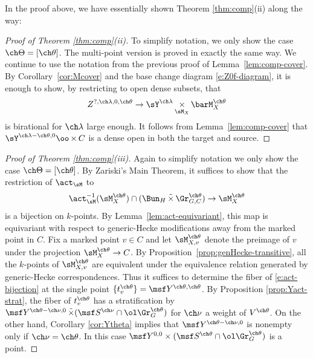 \documentclass[final]{amsart}
\theoremstyle{remark}
\theoremstyle{definition}
\DeclareMathOperator*{\ttimes}{\tilde\times}
\DeclareMathOperator*{\xt}{\times}
\numberwithin{equation}{section}
\begin{document}
In the proof above, we have essentially shown 
Theorem \ref{thm:comp}(ii) along the way:

\begin{proof}[Proof of Theorem \ref{thm:comp}(ii)] 
To simplify notation, we only show the case $\ch\Theta = [\ch\theta]$. 
The multi-point version is proved in exactly the same way. 
We continue to use the notation from the previous proof
of Lemma~\ref{lem:comp-cover}. 
By Corollary~\ref{cor:Mcover} and the base change diagram \eqref{e:Z0f-diagram}, 
it is enough to show, by restricting to open dense subsets, that 
\[ Z^{?,\ch\lambda,0,\ch\theta} \to \sY^{\ch\lambda} \xt_{\sM_X} \barM_X^{\ch\theta} \] 
is birational for $\ch\lambda$ large enough. 
It follows from Lemma~\ref{lem:comp-cover} that 
$\sY^{\ch\lambda-\ch\theta,0} \oo\xt C$ is a dense open 
in both the target and source. 
\end{proof}


\begin{proof}[Proof of Theorem \ref{thm:comp}(iii)]
Again to simplify notation we only show the case $\ch\Theta = [\ch\theta]$.
By Zariski's Main Theorem, it suffices to show that 
the restriction of $\act_\sM$ to 
\begin{equation} \label{e:act-bijection}
\act_\sM^{-1}(\sM^{\ch\theta}_X) \cap (\Bun_H \ttimes \Gr_{G,C}^{\ch\theta}) \to \sM_X^{\ch\theta}
\end{equation}
is a bijection on $k$-points. 
By Lemma~\ref{lem:act-equivariant}, this map is equivariant with respect to
generic-Hecke modifications away from the marked point in $C$. 
Fix a marked point $v\in C$ and let $\sM^{\ch\theta}_{X,v}$ denote 
the preimage of $v$ under the projection $\sM^{\ch\theta}_X \to C$.
By Proposition~\ref{prop:genHecke-transitive}, all the $k$-points 
of $\sM^{\ch\theta}_{X,v}$ are equivalent under 
the equivalence relation generated by generic-Hecke correspondences.  
Thus it suffices to determine the fiber of \eqref{e:act-bijection}
at the single point $\{t_v^{\ch\theta}\} = \msf Y^{\ch\theta,\ch\theta}$.  
By Proposition \ref{prop:Yact-strat}, 
the fiber of $t_v^{\ch\theta}$ has a stratification by 
$\msf Y^{\ch\theta-\ch\nu,0} \ttimes (\msf S^{\ch\nu} \cap \ol\Gr^{\ch\theta}_G)$
for $\ch\nu$ a weight of $V^{\ch\theta}$. 
On the other hand, Corollary \ref{cor:Ytheta} implies that 
$\msf Y^{\ch\theta-\ch\nu,0}$ is nonempty only if $\ch\nu=\ch\theta$. 
In this case $\msf Y^{0,0} \times (\msf S^{\ch\theta}\cap \ol\Gr^{\ch\theta}_G)$
is a point. 
\end{proof}
\end{document}
